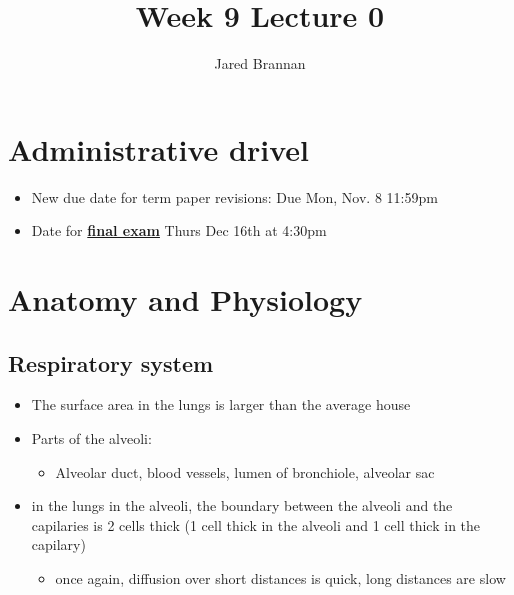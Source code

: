\documentclass{article}
\title{Week 9 Lecture 0}
\author{Jared Brannan }
\theoremstyle{definition}
\begin{document}
\maketitle

\section{Administrative drivel}
\begin{itemize}
	\item New due date for term paper revisions: Due Mon, Nov. 8 11:59pm
	\item Date for \underline{\textbf{final exam}} Thurs Dec 16th at 4:30pm
\end{itemize}

\section{Anatomy and Physiology}
\subsection{Respiratory system}
\begin{itemize}
	\item The surface area in the lungs is larger than the average house
	\item Parts of the alveoli:
		\begin{itemize}
			\item Alveolar duct, blood vessels, lumen of bronchiole, alveolar sac
		\end{itemize}
	\item in the lungs in the alveoli, the boundary between the alveoli and the capilaries is 2 cells thick (1 cell thick in the alveoli and 1 cell thick in the capilary)
		\begin{itemize}
			\item once again, diffusion over short distances is quick, long distances are slow
		\end{itemize}
\end{itemize}
\end{document}
